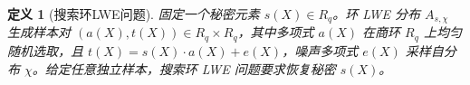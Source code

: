 \documentclass[12pt,a4paper]{article}
\newtheorem{definition}{定义} %
\numberwithin{equation}{section}
\begin{document}
\begin{definition}[搜索环LWE问题]
固定一个秘密元素 \(s(X) \in R_q\)。环 LWE 分布 \(A_{s,\chi}\) 生成样本对 \((a(X), t(X)) \in R_q \times R_q\)，其中多项式 \(a(X)\) 在商环 \(R_q\) 上均匀随机选取，且 \(t(X) = s(X) \cdot a(X) + e(X)\)，噪声多项式 \(e(X)\) 采样自分布 \(\chi\)。给定任意独立样本，搜索环 LWE 问题要求恢复秘密 \(s(X)\)。
\end{definition}





\end{document}

